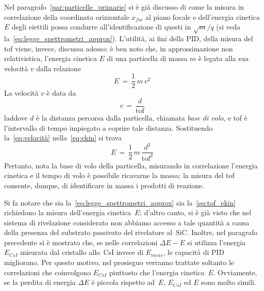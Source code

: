 Nel paragrafo~\ref{par:particelle_primarie} si è già discusso di come la misura in correlazione della coordinata orizzontale $x_{foc}$ al piano focale e dell'energia cinetica $E$ degli eiettili possa condurre all'identificazione di questi in $\sqrt{m}/q$ (si veda la~\ref{eq:legge_spettrometri_approx}).
L'utilità, ai fini della PID, della misura del tof viene, invece, discussa adesso: è ben noto che, in approssimazione non relativistica, l'energia cinetica $E$ di una particella di massa $m$ è legata alla sua velocità $v$ dalla relazione
\begin{equation} \label{eq:ekin}
	E \, = \, \frac{1}{2} \, m \, v^2
\end{equation}
La velocità $v$ è data da
\begin{equation} \label{eq:velocità}
v \, = \, \frac{d}{\mbox{tof}}
\end{equation}
laddove $d$ è la distanza percorsa dalla particella, chiamata \emph{base di volo}, e tof è l'intervallo di tempo impiegato a coprire tale distanza.
Sostituendo la~\ref{eq:velocità} nella~\ref{eq:ekin} si trova
\begin{equation} \label{eq:tof_ekin}
E \, = \, \frac{1}{2} \, m \, \frac{d^2}{\mbox{tof}^2}
\end{equation}
Pertanto, nota la base di volo della particella, misurando in correlazione l'energia cinetica e il tempo di volo è possibile ricavarne la massa; la misura del tof consente, dunque, di identificare in massa i prodotti di reazione.

Si fa notare che sia la~\ref{eq:legge_spettrometri_approx} sia la~\ref{eq:tof_ekin} richiedono la misura dell'energia cinetica~$E$; d'altro canto,  si è già visto che nel sistema di rivelazione considerato non abbiamo accesso a tale quantità a causa della presenza del substrato passivato del rivelatore al~SiC.
Inoltre, nel paragrafo precedente si è mostrato che, se nelle correlazioni $\Delta E - E$ si utilizza l'energia $E_{CsI}$ misurata dal cristallo allo~CsI invece di $E_{meas}$, le capacità di PID migliorano.
Per questo motivo, nel prosieguo verranno trattate soltanto le correlazioni che coinvolgono $E_{CsI}$ piuttosto che l'energia cinetica~$E$.
Ovviamente, se la perdita di energia $\Delta E$ è piccola rispetto ad~$E$, $E_{CsI}$ ed $E$ sono molto simili.

